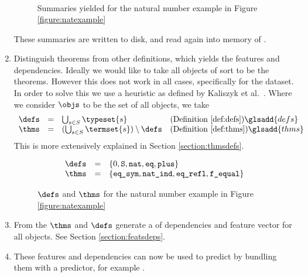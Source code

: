 \begin{enumerate}
\begin{figure}[H]
\[\begin{array}{rcl}
				\end{array}
			\]
			\caption{Summaries yielded for the natural number example in Figure \ref{figure:natexample}}
		\end{figure}
		These summaries are written to disk, and read again into memory of \roerei.
	\item Distinguish theorems from other definitions, which yields the features and dependencies.
		Ideally we would like to take all objects of sort \sortprop to be the theorems.
		However this does not work in all cases, specifically for the \corn dataset.
		In order to solve this we use a heuristic as defined by Kaliszyk et al.\ \cite{kaliszyk2014machine}.
		Where we consider $\objs$ to be the set of all \coq objects, we take
    \[
      \begin{array}{rcll}
        \defs & = & \bigcup_{s \in S} \typeset{s} & \text{(Definition \ref{def:defs})}\glsadd{defs} \\
        \thms & = & (\bigcup_{s \in S} \termset{s}) \setminus \defs & \text{(Definition \ref{def:thms})}\glsadd{thms}
      \end{array}
    \]
		This is more extensively explained in Section \ref{section:thmsdefs}.
		\begin{figure}[H]
			\[
				\begin{array}{rcl}
					\defs & = & \{ 0, \texttt{S}, \texttt{nat}, \texttt{eq}, \texttt{plus} \} \\
					\thms & = & \{ \texttt{eq\_sym}, \texttt{nat\_ind}, \texttt{eq\_refl}, \texttt{f\_equal} \}
				\end{array}
			\]
			\caption{$\defs$ and $\thms$ for the natural number example in Figure \ref{figure:natexample}}
		\end{figure}
    \item From the $\thms$ and $\defs$ generate a \dagraph of dependencies and feature vector for all \coq objects.
      See Section \ref{section:featsdeps}.
		 
	\item These features and dependencies can now be used to predict by bundling them with a predictor, for example \knn.
\end{enumerate}


